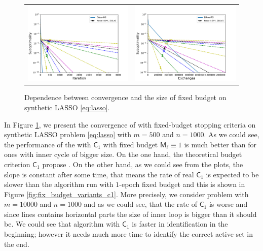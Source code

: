 \begin{figure}[b!]
\begin{tabular}{cc}
\includegraphics[width = 0.49\linewidth]{spy/figs/lasso_5w_1000_500_fun_vs_ite_log_coordinate.pdf}&
\includegraphics[width = 0.49\linewidth]{spy/figs/lasso_5w_1000_500_fun_vs_ex_log_coordinate.pdf}\\%
\end{tabular}
\caption{Dependence between convergence and the size of fixed budget on synthetic LASSO \eqref{eq:lasso}.}
\label{fig:fix_budget_variants}
\end{figure}
In Figure \ref{fig:fix_budget_variants}, we present the convergence of \recoalgo with fixed-budget stopping criteria on synthetic LASSO problem \eqref{eq:lasso} with $m=500$ and $n = 1000$. As we could see, the performance of the \recoalgo with $\mathsf{C}_1$ with fixed budget $\mathsf{M}_\ell\equiv 1$ is much better than for ones with inner cycle of bigger size. On the one hand, the theoretical budget criterion $\mathsf{C}_1$ propose . On the other hand, as we could see from the plots, the slope is constant after some time, that means the rate of real $\mathsf{C}_1$ is expected to be slower than the algorithm run with $1$-epoch fixed budget and this is shown in Figure \ref{fig:fix_budget_variants_c1}. More precisely, we consider problem with $m=10000$ and $n=1000$ and as we could see, that the rate of $\mathsf{C}_1$ is worse and since lines contains horizontal parts the size of inner loop is bigger than it should be. We could see that algorithm with $\mathsf{C}_1$ is faster in identification in the beginning; however it needs much more time to identify the correct active-set in the end.
